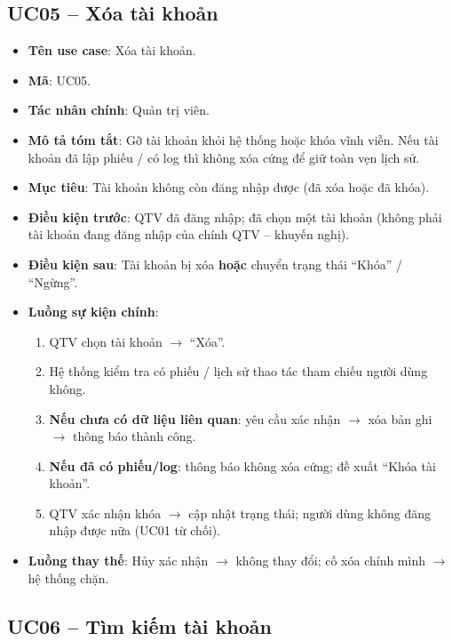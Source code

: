 \subsection{UC05 -- Xóa tài khoản}

\begin{itemize}[leftmargin=1.5cm]
    \item \textbf{Tên use case}: Xóa tài khoản.
    \item \textbf{Mã}: UC05.
    \item \textbf{Tác nhân chính}: Quản trị viên.
    \item \textbf{Mô tả tóm tắt}: Gỡ tài khoản khỏi hệ thống hoặc khóa vĩnh viễn. Nếu tài khoản đã lập phiếu / có log thì không xóa cứng để giữ toàn vẹn lịch sử.
    \item \textbf{Mục tiêu}: Tài khoản không còn đăng nhập được (đã xóa hoặc đã khóa).
    \item \textbf{Điều kiện trước}: QTV đã đăng nhập; đã chọn một tài khoản (không phải tài khoản đang đăng nhập của chính QTV -- khuyến nghị).
    \item \textbf{Điều kiện sau}: Tài khoản bị xóa \textbf{hoặc} chuyển trạng thái ``Khóa'' / ``Ngừng''.
    \item \textbf{Luồng sự kiện chính}:
    \begin{enumerate}
        \item QTV chọn tài khoản $\rightarrow$ ``Xóa''.
        \item Hệ thống kiểm tra có phiếu / lịch sử thao tác tham chiếu người dùng không.
        \item \textbf{Nếu chưa có dữ liệu liên quan}: yêu cầu xác nhận $\rightarrow$ xóa bản ghi $\rightarrow$ thông báo thành công.
        \item \textbf{Nếu đã có phiếu/log}: thông báo không xóa cứng; đề xuất ``Khóa tài khoản''.
        \item QTV xác nhận khóa $\rightarrow$ cập nhật trạng thái; người dùng không đăng nhập được nữa (UC01 từ chối).
    \end{enumerate}
    \item \textbf{Luồng thay thế}: Hủy xác nhận $\rightarrow$ không thay đổi; cố xóa chính mình $\rightarrow$ hệ thống chặn.
\end{itemize}

\subsection{UC06 -- Tìm kiếm tài khoản}

